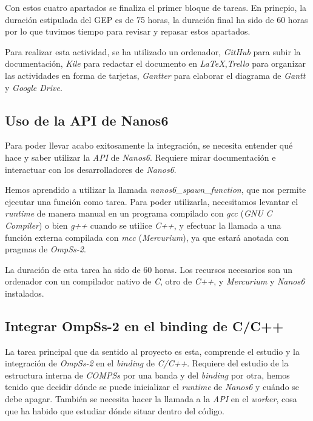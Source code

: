 Con estos cuatro apartados se finaliza el primer bloque de tareas. En princpio, la duración estipulada del GEP es de 75 horas, la duración final ha sido de 60 horas por lo que tuvimos tiempo para revisar y repasar estos apartados.

\par\bigskip

Para realizar esta actividad, se ha utilizado un ordenador, \textit{GitHub} para subir la documentación, \textit{Kile} para redactar el documento en \textit{LaTeX},\textit{Trello} para organizar las actividades en forma de tarjetas, \textit{Gantter} para elaborar el diagrama de \textit{Gantt} y \textit{Google Drive}.

\subsection{Uso de la API de Nanos6}

Para poder llevar acabo exitosamente la integración, se necesita entender qué hace y saber utilizar la \textit{API} de \textit{Nanos6}. Requiere mirar documentación e interactuar con los desarrolladores de \textit{Nanos6}. 
\par\bigskip

Hemos aprendido a utilizar la llamada \textit{nanos6\_spawn\_function}, que nos permite ejecutar una función como tarea. Para poder utilizarla, necesitamos levantar el \textit{runtime} de manera manual en un programa compilado con \textit{gcc} (\textit{GNU C Compiler}) o bien \textit{g++} cuando se utilice \textit{C++}, y efectuar la llamada a una función externa compilada con \textit{mcc} (\textit{Mercurium}), ya que estará anotada con pragmas de \textit{OmpSs-2}.
\par\bigskip

La duración de esta tarea ha sido de 60 horas. Los recursos necesarios son un ordenador con un compilador nativo de \textit{C}, otro de \textit{C++}, y \textit{Mercurium} y \textit{Nanos6} instalados. 

\subsection{Integrar OmpSs-2 en el binding de C/C++}

La tarea principal que da sentido al proyecto es esta, comprende el estudio y la integración de \textit{OmpSs-2} en el \textit{binding} de \textit{C/C++}. Requiere del estudio de la estructura interna de \textit{COMPSs} por una banda y del \textit{binding} por otra, hemos tenido que decidir dónde se puede inicializar el \textit{runtime} de \textit{Nanos6} y cuándo se debe apagar. También se necesita hacer la llamada a la \textit{API} en el \textit{worker}, cosa que ha habido que estudiar dónde situar dentro del código.
\par\bigskip

